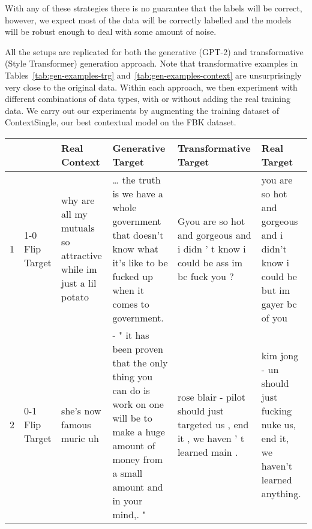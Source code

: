 \documentclass[acmsmall]{acmart}
\begin{document}
With any of these strategies there is no guarantee that the labels will be correct, however, we expect most of the data will be correctly labelled and the models will be robust enough to deal with some amount of noise.

All the setups are replicated for both the generative (GPT-2) and transformative (Style Transformer) generation approach. Note that transformative examples in Tables~\ref{tab:gen-examples-trg} and~\ref{tab:gen-examples-context} are unsurprisingly very close to the original data. Within each approach, we then experiment with different combinations of data types, with or without adding the real training data. We carry out our experiments by augmenting the training dataset of ContextSingle, our best contextual model on the FBK dataset.

\begin{table*}[]
\begin{footnotesize}
\begin{tabular}{p{0.01cm}|p{1.3cm}|p{2.5cm}|p{2.5cm}|p{2.5cm}|p{2.5cm}}
\toprule 
& & \textbf{Real Context} & \textbf{Generative Target}  & \textbf{Transformative Target} & \textbf{Real Target}  \\ \midrule
1 & 1-0 Flip Target & why are all my mutuals so attractive while im just a lil potato & … the truth is we have a whole government that doesn't know what it's like to be fucked up when it comes to government. & Gyou are so hot and gorgeous and i didn ' t know i could be ass im bc fuck you ? &  you are so hot and gorgeous and i didn't know i could be but im gayer bc of you\\
2 & 0-1 Flip Target & she's now famous muric uh & - " it has been proven that the only thing you can do is work on one will be to make a huge amount of money from a small amount and in your mind,. " &  rose blair - pilot should just targeted us , end it , we haven ' t learned main . & kim jong - un should just fucking nuke us, end it, we haven't learned anything. \\
\bottomrule
\end{tabular}
\end{footnotesize}
\caption{\label{tab:gen-examples-trg} Examples of target posts generated by the fine-tuned GPT-2 model (Generative) and the Style Transformer model (Transformative). 1-0 Flip Target is the setup where non-toxic (0) examples typically contain toxic words. 0-1 Flip Target is the setup where toxic (1) examples without toxic words are generated using the toxic context. Both type of examples require context to be labelled correctly.}
\end{table*}
\end{document}
